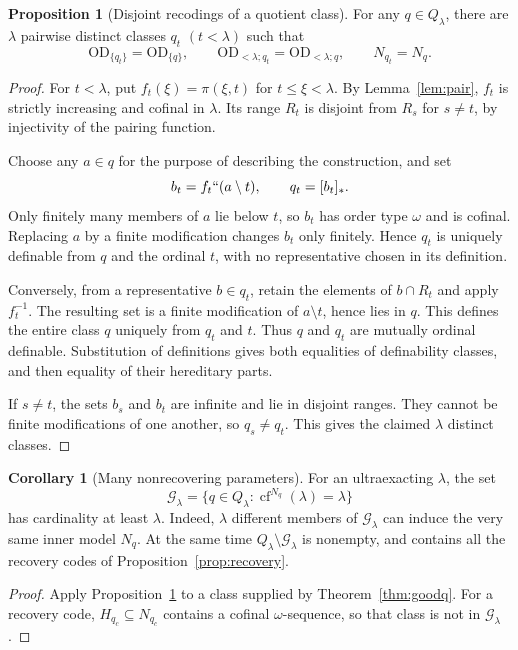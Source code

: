 \documentclass[11pt,letterpaper]{article}
\theoremstyle{definition}
\newtheorem{proposition}[definition]{Proposition}
\newtheorem{corollary}[definition]{Corollary}
\numberwithin{equation}{section}
\newcommand{\OD}{\mathrm{OD}}
\newcommand{\cf}{\operatorname{cf}}
\newcommand{\Qlam}{Q_\lambda}
\newcommand{\ODq}{\OD_{<\lambda;q}}
\newcommand{\Good}{\mathcal G_\lambda}
\newcommand{\qclass}[1]{[#1]_{*}}
\newcommand{\GPair}{\pi}
\newcommand{\ODone}[1]{\OD_{\{#1\}}}
\begin{document}
\begin{proposition}[Disjoint recodings of a quotient class]\label{prop:many}
For any $q\in\Qlam$, there are $\lambda$ pairwise distinct classes $q_t$ $(t<\lambda)$ such that
\[
\ODone{q_t}=\ODone q,
\qquad \OD_{<\lambda;q_t}=\ODq,
\qquad N_{q_t}=N_q.
\]
\end{proposition}

\begin{proof}
For $t<\lambda$, put $f_t(\xi)=\GPair(\xi,t)$ for $t\le\xi<\lambda$. By Lemma~\ref{lem:pair}, $f_t$ is strictly increasing and cofinal in $\lambda$. Its range $R_t$ is disjoint from $R_s$ for $s\ne t$, by injectivity of the pairing function.

Choose any $a\in q$ for the purpose of describing the construction, and set
\[
b_t=f_t``(a\setminus t),\qquad q_t=\qclass{b_t}.
\]
Only finitely many members of $a$ lie below $t$, so $b_t$ has order type $\omega$ and is cofinal. Replacing $a$ by a finite modification changes $b_t$ only finitely. Hence $q_t$ is uniquely definable from $q$ and the ordinal $t$, with no representative chosen in its definition.

Conversely, from a representative $b\in q_t$, retain the elements of $b\cap R_t$ and apply $f_t^{-1}$. The resulting set is a finite modification of $a\setminus t$, hence lies in $q$. This defines the entire class $q$ uniquely from $q_t$ and $t$. Thus $q$ and $q_t$ are mutually ordinal definable. Substitution of definitions gives both equalities of definability classes, and then equality of their hereditary parts.

If $s\ne t$, the sets $b_s$ and $b_t$ are infinite and lie in disjoint ranges. They cannot be finite modifications of one another, so $q_s\ne q_t$. This gives the claimed $\lambda$ distinct classes.
\end{proof}

\begin{corollary}[Many nonrecovering parameters]\label{cor:manygood}
For an ultraexacting $\lambda$, the set
\[
\Good=\{q\in\Qlam:\cf^{N_q}(\lambda)=\lambda\}
\]
has cardinality at least $\lambda$. Indeed, $\lambda$ different members of $\Good$ can induce the very same inner model $N_q$. At the same time $\Qlam\setminus\Good$ is nonempty, and contains all the recovery codes of Proposition~\ref{prop:recovery}.
\end{corollary}

\begin{proof}
Apply Proposition~\ref{prop:many} to a class supplied by Theorem~\ref{thm:goodq}. For a recovery code, $H_{q_c}\subseteq N_{q_c}$ contains a cofinal $\omega$-sequence, so that class is not in $\Good$.
\end{proof}
\end{document}

